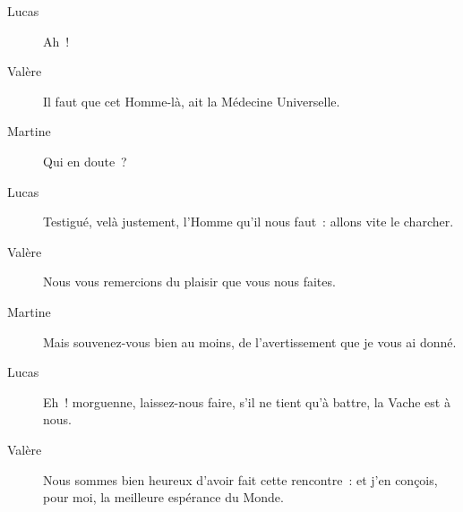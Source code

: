 \documentclass[french,twoside]{book} %
\begin{document}
 \begin{description} \item[Lucas] 

Ah !\end{description}
 \begin{description} \item[Valère] 

Il faut que cet Homme-là, ait la Médecine Universelle.\end{description}
 \begin{description} \item[Martine] 

Qui en doute ?\end{description}
 \begin{description} \item[Lucas] 

Testigué, velà justement, l’Homme qu’il nous faut : allons vite le charcher.\end{description}
 \begin{description} \item[Valère] 

Nous vous remercions du plaisir que vous nous faites.\end{description}
 \begin{description} \item[Martine] 

Mais souvenez-vous bien au moins, de l’avertissement que je vous ai donné.\end{description}
 \begin{description} \item[Lucas] 

Eh ! morguenne, laissez-nous faire, s’il ne tient qu’à battre, la Vache est à nous.\end{description}
 \begin{description} \item[Valère] 

Nous sommes bien heureux d’avoir fait cette rencontre : et j’en conçois, pour moi, la meilleure espérance du Monde.\end{description}
\end{document}
